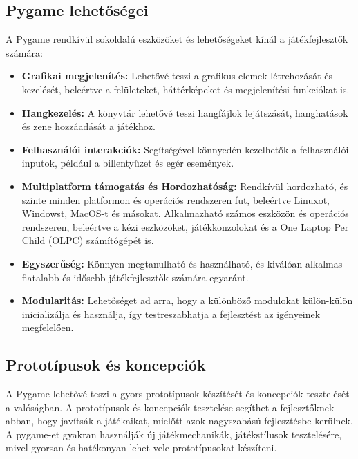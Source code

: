 \subsection{Pygame lehetőségei}
\indent \indent A Pygame rendkívül sokoldalú eszközöket és lehetőségeket kínál a játékfejlesztők számára:

\begin{itemize}
    
\item    \textbf{Grafikai megjelenítés:} Lehetővé teszi a grafikus elemek létrehozását és kezelését, beleértve a felületeket, háttérképeket és megjelenítési funkciókat is.
    
\item    \textbf{Hangkezelés:} A könyvtár lehetővé teszi hangfájlok lejátszását, hanghatások és zene hozzáadását a játékhoz.
    
\item    \textbf{Felhasználói interakciók:} Segítségével könnyedén kezelhetők a felhasználói inputok, például a billentyűzet és egér események.
    
\item    \textbf{Multiplatform támogatás és Hordozhatóság:} Rendkívül hordozható, és szinte minden platformon és operációs rendszeren fut, beleértve Linuxot, Windowst, MacOS-t és másokat. Alkalmazható számos eszközön és operációs rendszeren, beleértve a kézi eszközöket, játékkonzolokat és a One Laptop Per Child (OLPC)\cite{olpc} számítógépét is.
    
\item    \textbf{Egyszerűség:} Könnyen megtanulható és használható, és kiválóan alkalmas fiatalabb és idősebb játékfejlesztők számára egyaránt.
    
\item    \textbf{Modularitás:} Lehetőséget ad arra, hogy a különböző modulokat külön-külön inicializálja és használja, így testreszabhatja a fejlesztést az igényeinek megfelelően.
\end{itemize}


\subsection{Prototípusok és koncepciók}
\indent \indent A Pygame lehetővé teszi a gyors prototípusok készítését és koncepciók tesztelését a valóságban. A prototípusok és koncepciók tesztelése segíthet a fejlesztőknek abban, hogy javítsák a játékaikat, mielőtt azok nagyszabású fejlesztésbe kerülnek. A pygame-et gyakran használják új játékmechanikák, játékstílusok tesztelésére, mivel gyorsan és hatékonyan lehet vele prototípusokat készíteni.

